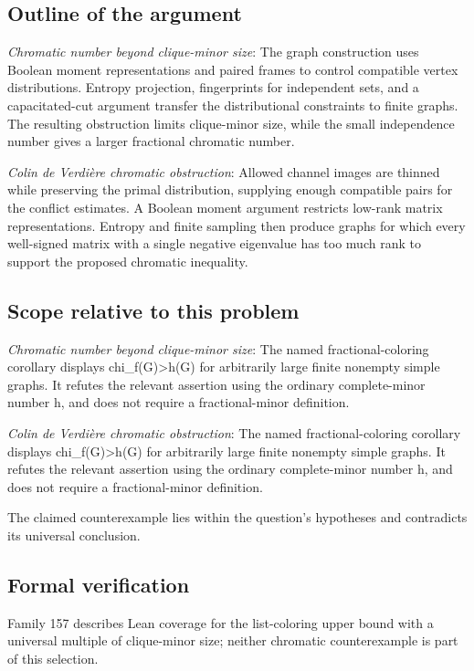 \documentclass[11pt]{article}
\begin{document}
\subsection{Outline of the argument}
\textit{Chromatic number beyond clique-minor size}: The graph construction uses Boolean moment representations and paired frames to control compatible vertex distributions. Entropy projection, fingerprints for independent sets, and a capacitated-cut argument transfer the distributional constraints to finite graphs. The resulting obstruction limits clique-minor size, while the small independence number gives a larger fractional chromatic number.

\textit{Colin de Verdière chromatic obstruction}: Allowed channel images are thinned while preserving the primal distribution, supplying enough compatible pairs for the conflict estimates. A Boolean moment argument restricts low-rank matrix representations. Entropy and finite sampling then produce graphs for which every well-signed matrix with a single negative eigenvalue has too much rank to support the proposed chromatic inequality.

\subsection{Scope relative to this problem}
\textit{Chromatic number beyond clique-minor size}: The named fractional-coloring corollary displays chi\_f(G)>h(G) for arbitrarily large finite nonempty simple graphs. It refutes the relevant assertion using the ordinary complete-minor number h, and does not require a fractional-minor definition.

\textit{Colin de Verdière chromatic obstruction}: The named fractional-coloring corollary displays chi\_f(G)>h(G) for arbitrarily large finite nonempty simple graphs. It refutes the relevant assertion using the ordinary complete-minor number h, and does not require a fractional-minor definition.

The claimed counterexample lies within the question’s hypotheses and contradicts its universal conclusion.

\subsection{Formal verification}
Family 157 describes Lean coverage for the list-coloring upper bound with a universal multiple of clique-minor size; neither chromatic counterexample is part of this selection.
\end{document}
